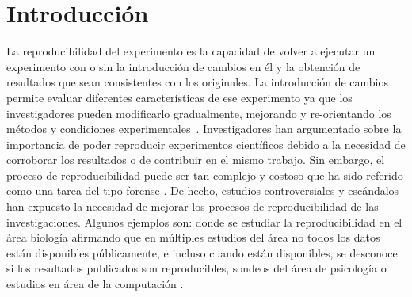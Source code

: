 \chapter{Introducción}
\label{Chapter1} 
\newcommand{\keyword}[1]{\textbf{#1}}
\newcommand{\tabhead}[1]{\textbf{#1}}
\newcommand{\code}[1]{\texttt{#1}}
\newcommand{\file}[1]{\texttt{\bfseries#1}}
\newcommand{\option}[1]{\texttt{\itshape#1}}
La reproducibilidad del experimento es la capacidad de volver a ejecutar un experimento con o sin la introducción de cambios en él y la obtención de resultados que sean consistentes con los originales.
La introducción de cambios permite evaluar diferentes características de ese experimento ya que los investigadores pueden modificarlo gradualmente, mejorando y re-orientando los métodos y condiciones experimentales~\cite{stodden2010reproducible}.
Investigadores han argumentado sobre la importancia de poder reproducir experimentos científicos debido a la necesidad de corroborar los resultados o de contribuir en el mismo trabajo.
Sin embargo, el proceso de reproducibilidad puede ser tan complejo y costoso que ha sido referido como una tarea del tipo forense \cite{baggerly2009deriving}.
De hecho, estudios controversiales y escándalos han expuesto la necesidad de mejorar los procesos de reproducibilidad de las investigaciones. 
Algunos ejemplos son: \cite{ioannidis2009repeatability} donde se estudiar la reproducibilidad en el área biología afirmando que en múltiples estudios del área no todos los datos están disponibles públicamente, e incluso cuando están disponibles, se desconoce si los resultados publicados son reproducibles, 
sondeos del área de psicología  \cite{open2015estimating} 
o estudios en área de la computación \cite{baggerly2009deriving}.

